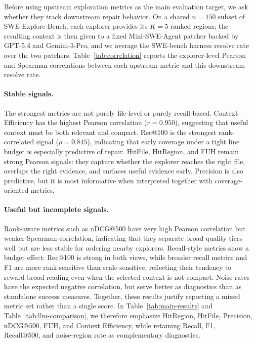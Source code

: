 \documentclass{llmxive}
\begin{document}
Before using upstream exploration metrics as the main evaluation target, we ask whether they track downstream repair behavior. On a shared $n{=}150$ subset of SWE-Explore Bench, each explorer provides its $K{=}5$ ranked regions; the resulting context is then given to a fixed Mini-SWE-Agent patcher backed by GPT-5.4 and Gemini-3-Pro, and we average the SWE-bench harness resolve rate over the two patchers. Table~\ref{tab:correlation} reports the explorer-level Pearson and Spearman correlations between each upstream metric and this downstream resolve rate.
 
\paragraph{Stable signals.}
The strongest metrics are not purely file-level or purely recall-based. Context Efficiency has the highest Pearson correlation ($r{=}0.950$), suggesting that useful context must be both relevant and compact. Rec@100 is the strongest rank-correlated signal ($\rho{=}0.845$), indicating that early coverage under a tight line budget is especially predictive of repair. HitFile, HitRegion, and FUH remain strong Pearson signals: they capture whether the explorer reaches the right file, overlaps the right evidence, and surfaces useful evidence early. Precision is also predictive, but it is most informative when interpreted together with coverage-oriented metrics.

 
\paragraph{Useful but incomplete signals.}
Rank-aware metrics such as nDCG@500 have very high Pearson correlation but weaker Spearman correlation, indicating that they separate broad quality tiers well but are less stable for ordering nearby explorers. Recall-style metrics show a budget effect: Rec@100 is strong in both views, while broader recall metrics and F1 are more rank-sensitive than scale-sensitive, reflecting their tendency to reward broad reading even when the selected context is not compact. Noise rates have the expected negative correlation, but serve better as diagnostics than as standalone success measures. Together, these results justify reporting a mixed metric set rather than a single score. In Table~\ref{tab:main-results} and Table~\ref{tab:llm-comparison}, we therefore emphasize HitRegion, HitFile, Precision, nDCG@500, FUH, and Context Efficiency, while retaining Recall, F1, Recall@500, and noise-region rate as complementary diagnostics.
\end{document}

